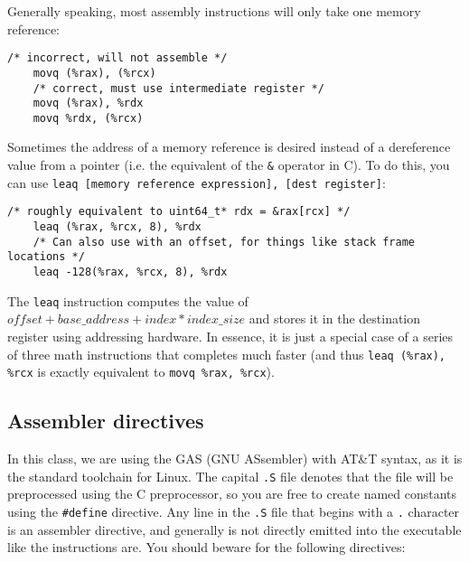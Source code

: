 \documentclass[11pt]{article}
\begin{document}
Generally speaking, most assembly instructions will only take one memory reference:

\begin{lstlisting}[caption={Using multiple memory references correctly}, captionpos=b]
    /* incorrect, will not assemble */
    movq (%rax), (%rcx)
    /* correct, must use intermediate register */
    movq (%rax), %rdx
    movq %rdx, (%rcx)
\end{lstlisting}

Sometimes the address of a memory reference is desired instead of a dereference value from
a pointer (i.e. the equivalent of the \texttt{\&} operator in C). To do this, you can use
\texttt{leaq [memory reference expression], [dest register]}:

\begin{lstlisting}[caption={\texttt{leaq} instruction example}, captionpos=b]
    /* roughly equivalent to uint64_t* rdx = &rax[rcx] */
    leaq (%rax, %rcx, 8), %rdx
    /* Can also use with an offset, for things like stack frame locations */
    leaq -128(%rax, %rcx, 8), %rdx
\end{lstlisting}

The \texttt{leaq} instruction computes the value of $offset + base\_address + index *
index\_size$ and stores it in the destination register using addressing hardware. In
essence, it is just a special case of a series of three math instructions that completes
much faster (and thus \texttt{leaq (\%rax), \%rcx} is exactly equivalent to \texttt{movq
\%rax, \%rcx}).

\subsection{Assembler directives}

In this class, we are using the GAS (GNU ASsembler) with AT\&T syntax, as it is the
standard toolchain for Linux. The capital \texttt{.S} file denotes that the file will be
preprocessed using the C preprocessor, so you are free to create named constants using the
\texttt{\#define} directive. Any line in the \texttt{.S} file that begins with a \texttt{.}
character is an assembler directive, and generally is not directly emitted into the
executable like the instructions are. You should beware for the following directives:
\end{document}
